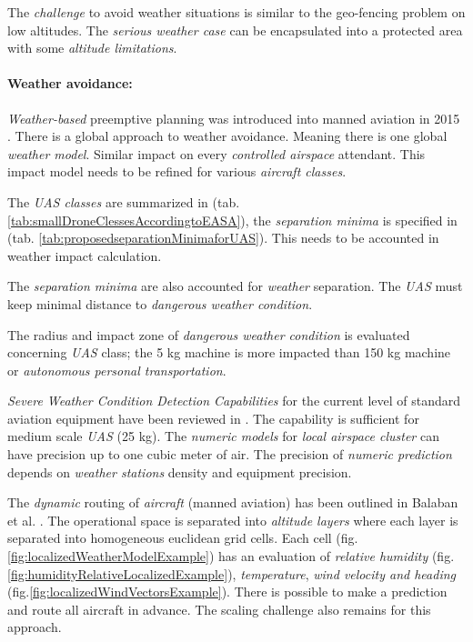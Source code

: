The \emph{challenge} to avoid weather situations is similar to the geo-fencing problem on low altitudes. The \emph{serious weather case} can be encapsulated into a protected area with some \emph{altitude limitations}.

\paragraph{Weather avoidance:} \emph{Weather-based} preemptive planning was introduced into manned aviation in 2015 \cite{yamashita2015climate}. There is a  global approach to weather avoidance. Meaning there is one global \emph{weather model}. Similar impact on every \emph{controlled airspace} attendant. This impact model needs to be refined for various \emph{aircraft classes}.  

\begin{note}
    The \emph{UAS classes} are summarized in (tab. \ref{tab:smallDroneClessesAccordingtoEASA}), the \emph{separation minima} is specified in (tab. \ref{tab:proposedseparationMinimaforUAS}). This needs to be accounted in weather impact calculation. 
    
    The \emph{separation minima} are also accounted for \emph{weather} separation. The \emph{UAS} must keep minimal distance to \emph{dangerous weather condition}.
    
    The radius and impact zone of \emph{dangerous weather condition} is evaluated concerning \emph{UAS} class; the 5 kg machine is more impacted than 150 kg machine or \emph{autonomous personal transportation}.
\end{note}
    
\emph{Severe Weather Condition Detection Capabilities} for the current level of standard aviation equipment have been reviewed in \cite{smith2016multi}. The capability is sufficient for medium scale \emph{UAS} (25 kg). The \emph{numeric models} for \emph{local airspace cluster} can have precision up to one cubic meter of air. The precision of \emph{numeric prediction} depends on \emph{weather stations} density and equipment precision.

The \emph{dynamic} routing of \emph{aircraft} (manned aviation) has been outlined in Balaban et al. \cite{balaban2017dynamic}. The operational space is separated into \emph{altitude layers} where each layer is separated into homogeneous euclidean grid cells. Each cell (fig. \ref{fig:localizedWeatherModelExample}) has an evaluation of \emph{relative humidity} (fig. \ref{fig:humidityRelativeLocalizedExample}), \emph{temperature}, \emph{wind velocity and heading} (fig.\ref{fig:localizedWindVectorsExample}). There is possible to make a prediction and route all aircraft in advance. The scaling challenge also remains for this approach. 

